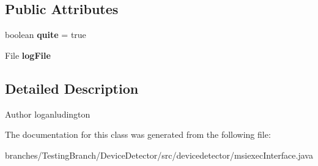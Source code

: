 \subsection*{Public Attributes}
\begin{DoxyCompactItemize}
\item 
\hypertarget{classdevicedetector_1_1msiexecInterface_a37415cd16a018c25018fef73000e74b9}{boolean {\bfseries quite} = true}\label{classdevicedetector_1_1msiexecInterface_a37415cd16a018c25018fef73000e74b9}

\item 
\hypertarget{classdevicedetector_1_1msiexecInterface_abdcbd5d14dadae4d73226f19c986356d}{File {\bfseries log\-File}}\label{classdevicedetector_1_1msiexecInterface_abdcbd5d14dadae4d73226f19c986356d}

\end{DoxyCompactItemize}


\subsection{Detailed Description}
\begin{DoxyAuthor}{Author}
loganludington 
\end{DoxyAuthor}


The documentation for this class was generated from the following file\-:\begin{DoxyCompactItemize}
\item 
branches/\-Testing\-Branch/\-Device\-Detector/src/devicedetector/msiexec\-Interface.\-java\end{DoxyCompactItemize}
